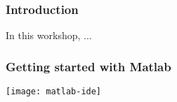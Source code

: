 \documentclass[9pt]{beamer-control}
\begin{document}

\begin{frame}
\frametitle{Introduction}
In this workshop, ...
\end{frame}


\begin{frame}[fragile]
\frametitle{Getting started with Matlab}

\texttt{[image: matlab-ide]}


\end{frame}
\end{document}
